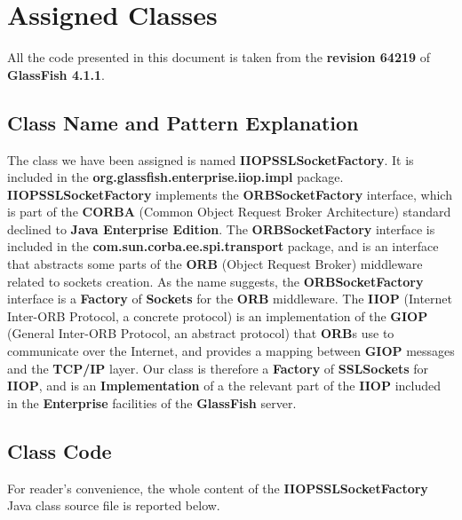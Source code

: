\section{Assigned Classes}
All the code presented in this document is taken from the \textbf{revision 64219} of \textbf{GlassFish 4.1.1}.

\subsection{Class Name and Pattern Explanation}
The class we have been assigned is named \textbf{IIOPSSLSocketFactory}.
It is included in the \textbf{org.glassfish.enterprise.iiop.impl} package.
\textbf{IIOPSSLSocketFactory} implements the \textbf{ORBSocketFactory} interface, which is part of the \textbf{CORBA} (Common Object Request Broker Architecture) standard declined to \textbf{Java Enterprise Edition}.
The \textbf{ORBSocketFactory} interface is included in the \textbf{com.sun.corba.ee.spi.transport} package, and is an interface that abstracts some parts of the \textbf{ORB} (Object Request Broker) middleware related to sockets creation.
As the name suggests, the \textbf{ORBSocketFactory} interface is a \textbf{Factory} of \textbf{Sockets} for the \textbf{ORB} middleware.
The \textbf{IIOP} (Internet Inter-ORB Protocol, a concrete protocol) is an implementation of the \textbf{GIOP} (General Inter-ORB Protocol, an abstract protocol) that \textbf{ORB}s use to communicate over the Internet, and provides a mapping between \textbf{GIOP} messages and the \textbf{TCP/IP} layer.
Our class is therefore a \textbf{Factory} of \textbf{SSLSockets} for \textbf{IIOP}, and is an \textbf{Implementation} of a the relevant part of the \textbf{IIOP} included in the \textbf{Enterprise} facilities of the \textbf{GlassFish} server.

\subsection{Class Code}
For reader's convenience, the whole content of the \textbf{IIOPSSLSocketFactory} Java class source file is reported below.
